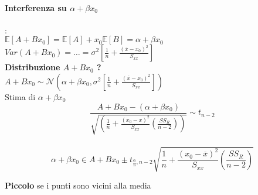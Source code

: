 \documentclass[]{article}
\newcommand{\ev}{\mathbb{E}[X]}
\renewcommand{\ev}[1]{\mathbb{E}[#1]}
\begin{document}
    \paragraph{Interferenza su $\alpha + \beta x_0$}: \\[2ex]
    $\ev{A+Bx_0} = \ev{A} + x_0 \ev{B} = \alpha + \beta x_0$ \\
    $Var(A+B x_0) = \ldots = \sigma^2[\frac{1}{n} + \frac{(\overline{x} - x_0)^2}{S_{xx}}]$ \\[3ex]
    \textbf{Distribuzione $A+B x_0$ ?} \\
    $A+B x_0 \sim \mathcal{N}(\alpha + \beta x_0, \sigma^2 [\frac{1}{n} + \frac{(\overline{x} - x_0)^2}{S_{xx}}])$ \\
    Stima di $\alpha + \beta x_0$ \\
    \[ \frac{A + B x_0 - (\alpha + \beta x_0)}{\sqrt{(\frac{1}{n} + \frac{(x_0 - x)^2}{S_{xx}}(\frac{SS_R}{n-2}))}} \sim t_{n-2} \] \\[2ex]
    \[ \alpha + \beta x_0 \in A + B x_0 \pm t_{\frac{\alpha}{n}, n-2} \sqrt{\frac{1}{n} + \frac{(x_0 - \overline{x})^2}{S_{xx}} (\frac{SS_R}{n-2})} \]
    \centerline{\textbf{Piccolo} se i punti sono vicini alla media}
\end{document}
